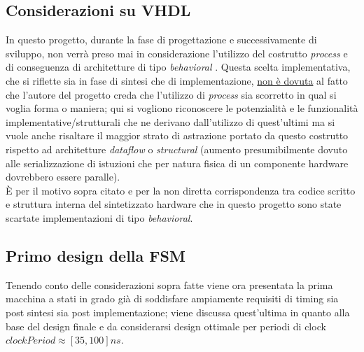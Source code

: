 \documentclass[11pt,a4paper]{article}
\begin{document}
        \subsection{Considerazioni su VHDL}
            In questo progetto, durante la fase di progettazione e successivamente di sviluppo, non verrà preso mai in considerazione l'utilizzo del costrutto \textit{process} e di conseguenza
             di architetture di tipo \textit{behavioral} . Questa scelta implementativa, che si riflette sia in fase di sintesi che di implementazione, \underline{non è dovuta} al fatto che l'autore 
             del progetto creda che l'utilizzo di \textit{process} sia scorretto in qual si voglia forma o maniera; qui si vogliono riconoscere le potenzialità e le funzionalità implementative/strutturali 
             che ne derivano dall'utilizzo di quest'ultimi ma si vuole anche risaltare il maggior strato di astrazione portato da questo costrutto rispetto ad architetture \textit{dataflow} o \textit{structural} (aumento presumibilmente
             dovuto alle serializzazione di istuzioni che per natura fisica di un componente hardware dovrebbero essere paralle).\\
            È per il motivo sopra citato e per la non diretta corrispondenza tra codice scritto e struttura interna del sintetizzato hardware che in questo progetto sono state scartate implementazioni di tipo \textit{behavioral}.
        \subsection{Primo design della FSM}
            Tenendo conto delle considerazioni sopra fatte viene ora presentata la prima macchina a stati in grado già di soddisfare ampiamente requisiti di timing sia post sintesi sia post implementazione; viene discussa quest'ultima in 
            quanto alla base del design finale e da considerarsi design ottimale per periodi di clock $clockPeriod \approx [35,100] ns$.
\end{document}

